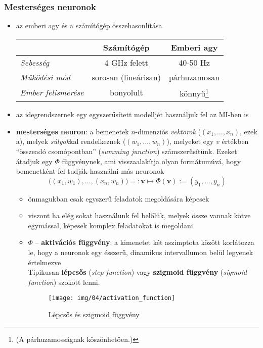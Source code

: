 \documentclass[a4paper, 11pt]{article}
\begin{document}
\subsubsection{Mesterséges neuronok}

\begin{itemize}
	\item az emberi agy és a számítógép összehasonlítása
	\begin{center}
		\begin{tabular}{|l|c|c|}
			\hline
			& \textbf{Számítógép} & \textbf{Emberi agy} \\
			\hline
			\textit{Sebesség} & 4 GHz felett & 40-50 Hz \\
			\hline
			\textit{Működési mód} & sorosan (lineárisan) & párhuzamosan \\
			\hline
			\textit{Ember felismerése} & bonyolult & könnyű\footnote{(A párhuzamosságnak köszönhetően.)} \\
			\hline
		\end{tabular}
	\end{center}
	\item az idegrendszernek egy egyszerűsített modelljét használjuk fel az MI-ben is
	\item \textbf{mesterséges neuron}: a bemenetek $n$-dimenziós \textit{vektorok} ($(x_1, \dots, x_n)$, ezek a), melyek \textit{súlyok}kal rendelkeznek ($(w_1, \dots, w_n)$), melyeket egy $v$ értékben ``összeadó csomópontban'' (\textit{summing junction}) számszerűsítünk. Ezeket átadjuk egy $\Phi$ függvénynek, ami visszaalakítja olyan formátumúvá, hogy bemenetként fel tudják használni más neuronok
	\[ \big( (x_1,w_1), \dots, (x_n, w_n) \big) =: \textbf{v} \mapsto \Phi(\textbf{v}) := (y_1, \dots, y_n) \]
	\begin{itemize}
		\item önmagukban csak egyszerű feladatok megoldására képesek
		\item viszont ha elég sokat használunk fel belőlük, melyek össze vannak kötve egymással, képesek komplex feladatokat is megoldani
		\item $\Phi$ -- \textbf{aktivációs függvény}: a kimenetet két aszimptota között korlátozza le, hogy a neuronok egy ésszerű, dinamikus intervallumon belül legyenek értelmezve \\ Tipikusan \textbf{lépcsős} (\textit{step function}) vagy \textbf{szigmoid függvény} (\textit{sigmoid function}) szokott lenni.
		\begin{figure}[h!]
			\centering
			\texttt{[image: img/04/activation\_function]}
			\caption{Lépcsős és szigmoid függvény}
		\end{figure}
	\end{itemize}
\end{itemize}
\end{document}
